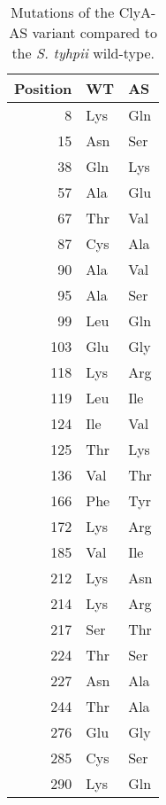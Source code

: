 \begin{table*}[h]


\renewcommand{\arraystretch}{1.5}
\scriptsize
\caption{Mutations of the ClyA-AS variant compared to the \textit{S. tyhpii} wild-type.}
\centering
\label{tab:clya_as_mutations}
\begin{tabular}{rll}
	\toprule
	Position	& WT	& AS \\
	\midrule
	8			& Lys	& Gln	\\
	15			& Asn	& Ser	\\
	38			& Gln	& Lys	\\
	57			& Ala	& Glu 	\\
	67			& Thr	& Val 	\\
	87			& Cys	& Ala 	\\
	90			& Ala	& Val	\\
	95			& Ala	& Ser 	\\
	99			& Leu	& Gln 	\\
	103	 		& Glu	& Gly	\\
	118			& Lys	& Arg 	\\
	119			& Leu	& Ile	\\
	124			& Ile	& Val	\\
	125			& Thr	& Lys	\\
	136			& Val	& Thr	\\
	166			& Phe	& Tyr	\\
	172			& Lys	& Arg	\\
	185			& Val	& Ile	\\
	212			& Lys	& Asn	\\
	214			& Lys	& Arg	\\
	217			& Ser	& Thr	\\
	224			& Thr	& Ser	\\
	227			& Asn	& Ala	\\
	244			& Thr 	& Ala	\\
	276			& Glu	& Gly	\\
	285			& Cys	& Ser	\\
	290			& Lys	& Gln	\\
	\bottomrule
\end{tabular}
\end{table*}

